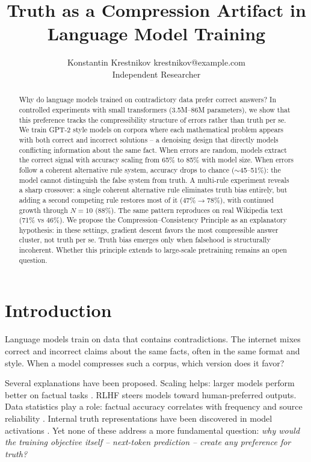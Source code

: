 \documentclass[10pt]{article} %
\title{Truth as a Compression Artifact in Language Model Training}
\author{\name Konstantin Krestnikov \email krestnikov@example.com \\
      \addr Independent Researcher}
\begin{document}
\maketitle

\begin{abstract}
Why do language models trained on contradictory data prefer correct answers? In controlled experiments with small transformers (3.5M--86M parameters), we show that this preference tracks the compressibility structure of errors rather than truth per se. We train GPT-2 style models on corpora where each mathematical problem appears with both correct and incorrect solutions -- a denoising design that directly models conflicting information about the same fact. When errors are random, models extract the correct signal with accuracy scaling from 65\% to 85\% with model size. When errors follow a coherent alternative rule system, accuracy drops to chance (${\sim}$45--51\%): the model cannot distinguish the false system from truth. A multi-rule experiment reveals a sharp crossover: a single coherent alternative rule eliminates truth bias entirely, but adding a second competing rule restores most of it (47\%$\to$78\%), with continued growth through $N{=}10$ (88\%). The same pattern reproduces on real Wikipedia text (71\% vs 46\%). We propose the Compression--Consistency Principle as an explanatory hypothesis: in these settings, gradient descent favors the most compressible answer cluster, not truth per se. Truth bias emerges only when falsehood is structurally incoherent. Whether this principle extends to large-scale pretraining remains an open question.
\end{abstract}

\section{Introduction}
\label{sec:intro}

Language models train on data that contains contradictions. The internet mixes correct and incorrect claims about the same facts, often in the same format and style. When a model compresses such a corpus, which version does it favor?

Several explanations have been proposed. Scaling helps: larger models perform better on factual tasks \citep{kadavath2022language}. RLHF steers models toward human-preferred outputs. Data statistics play a role: factual accuracy correlates with frequency and source reliability \citep{elazar2022measuring,joshi2024personas,kandpal2023large}. Internal truth representations have been discovered in model activations \citep{burns2023discovering,marks2023geometry}. Yet none of these address a more fundamental question: \textit{why would the training objective itself -- next-token prediction -- create any preference for truth?}
\end{document}
